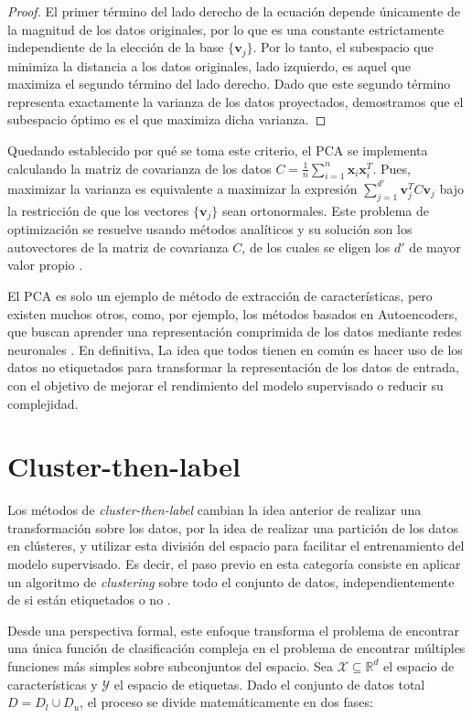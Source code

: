 \begin{proof}
    El primer término del lado derecho de la ecuación depende únicamente de la magnitud de los datos originales, por lo que es una constante estrictamente independiente de la elección de la base $\{\mathbf{v}_j\}$. Por lo tanto, el subespacio que minimiza la distancia a los datos originales, lado izquierdo, es aquel que maximiza el segundo término del lado derecho. Dado que este segundo término representa exactamente la varianza de los datos proyectados, demostramos que el subespacio óptimo es el que maximiza dicha varianza.
\end{proof}

Quedando establecido por qué se toma este criterio, el \gls{PCA} se implementa calculando la matriz de covarianza de los datos $C = \frac{1}{n} \sum_{i=1}^n \mathbf{x}_i \mathbf{x}_i^T$. Pues, maximizar la varianza es equivalente a maximizar la expresión $\sum_{j=1}^{d'} \mathbf{v}_j^T C \mathbf{v}_j$ bajo la restricción de que los vectores $\{\mathbf{v}_j\}$ sean ortonormales. Este problema de optimización se resuelve usando métodos analíticos y su solución son los autovectores de la matriz de covarianza $C$, de los cuales se eligen los $d'$ de mayor valor propio \cite{burges2010geometric}.

El \gls{PCA} es solo un ejemplo de método de extracción de características, pero existen muchos otros, como, por ejemplo, los métodos basados en Autoencoders, que buscan aprender una representación comprimida de los datos mediante redes neuronales \cite{LI2023110176}. En definitiva, La idea que todos tienen en común es hacer uso de los datos no etiquetados para transformar la representación de los datos de entrada, con el objetivo de mejorar el rendimiento del modelo supervisado o reducir su complejidad. 

\section{Cluster-then-label}

Los métodos de \textit{cluster-then-label} cambian la idea anterior de realizar una transformación sobre los datos, por la idea de realizar una partición de los datos en clústeres, y utilizar esta división del espacio para facilitar el entrenamiento del modelo supervisado. Es decir, el paso previo en esta categoría consiste en aplicar un algoritmo de \textit{clustering} sobre todo el conjunto de datos, independientemente de si están etiquetados o no \cite{van2020survey}. 

Desde una perspectiva formal, este enfoque transforma el problema de encontrar una única función de clasificación compleja en el problema de encontrar múltiples funciones más simples sobre subconjuntos del espacio. Sea $\mathcal{X} \subseteq \mathbb{R}^d$ el espacio de características y $\mathcal{Y}$ el espacio de etiquetas. Dado el conjunto de datos total $D = D_l \cup D_u$, el proceso se divide matemáticamente en dos fases:

